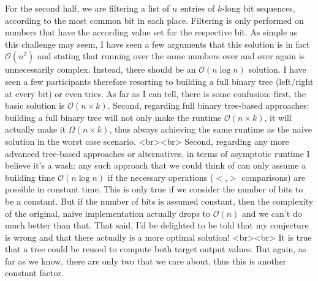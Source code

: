 For the second half, we are filtering a list of $n$ entries of $k$-long bit sequences, according to the most common bit in each place. Filtering is only performed on numbers that have the according value set for the respective bit. As simple as this challenge may seem, I have seen a few arguments that this solution is in fact $\mathcal{O}(n^2)$ and stating that running over the same numbers over and over again is unnecessarily complex. Instead, there should be an $\mathcal{O}(n \log n)$ solution. I have seen a few participants therefore resorting to building a full binary tree (left/right at every bit) or even tries. As far as I can tell, there is some confusion: first, the basic solution is $\mathcal{O}(n \times k)$. Second, regarding full binary tree-based approaches: building a full binary tree will not only make the runtime $\mathcal{O}(n \times k)$, it will actually make it $\mathcal{\Omega}(n \times k)$, thus always achieving the same runtime as the naive solution in the worst case scenario.
<br><br>
Second, regarding any more advanced tree-based approaches or alternatives, in terms of asymptotic runtime I believe it's a wash: any such approach that we could think of can only assume a building time $\mathcal{O}(n \log n)$ if the necessary operations ($<$,$>$ comparisons) are possible in constant time. This is only true if we consider the number of bits to be a constant. But if the number of bits is assumed constant, then the complexity of the original, naive implementation actually drops to  $\mathcal{O}(n)$ and we can't do much better than that. That said, I'd be delighted to be told that my conjecture is wrong and that there actually is a more optimal solution!
<br><br>
It is true that a tree could be reused to compute both target output values. But again, as far as we know, there are only two that we care about, thus this is another constant factor.